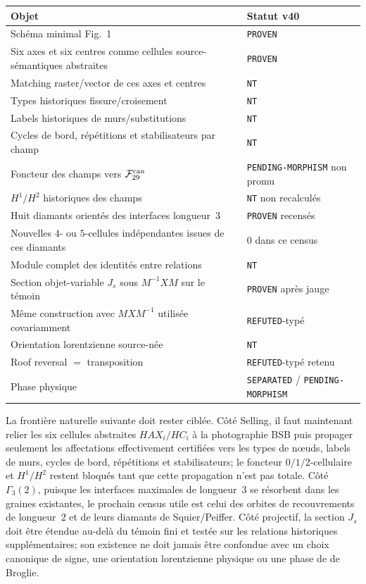 \documentclass[11pt,a4paper]{article}
\newcommand{\certProven}{\texttt{PROVEN}}
\newcommand{\certRefuted}{\texttt{REFUTED}}
\newcommand{\certSeparated}{\texttt{SEPARATED}}
\newcommand{\certPending}{\texttt{PENDING-MORPHISM}}
\newcommand{\certNT}{\texttt{NT}}
\begin{document}
\begin{center}
\begin{tabularx}{\textwidth}{@{}Xl@{}}
\toprule
Objet & Statut v40\\
\midrule
Schéma minimal Fig.~1 & \certProven\\
Six axes et six centres comme cellules source-sémantiques abstraites & \certProven\\
Matching raster/vector de ces axes et centres & \certNT\\
Types historiques fissure/croisement & \certNT\\
Labels historiques de murs/substitutions & \certNT\\
Cycles de bord, répétitions et stabilisateurs par champ & \certNT\\
Foncteur des champs vers $\mathcal F_{29}^{\rm can}$ & \certPending{} non promu\\
$H^1/H^2$ historiques des champs & \certNT{} non recalculés\\
Huit diamants orientés des interfaces longueur~$3$ & \certProven{} recensés\\
Nouvelles $4$- ou $5$-cellules indépendantes issues de ces diamants & $0$ dans ce census\\
Module complet des identités entre relations & \certNT\\
Section objet-variable $J_s$ sous $M^{-1}XM$ sur le témoin & \certProven{} après jauge\\
Même construction avec $MXM^{-1}$ utilisée covariamment & \certRefuted{}-typé\\
Orientation lorentzienne source-née & \certNT\\
Roof reversal $=$ transposition & \certRefuted{}-typé retenu\\
Phase physique & \certSeparated{} / \certPending\\
\bottomrule
\end{tabularx}
\end{center}

La frontière naturelle suivante doit rester ciblée. Côté Selling, il faut maintenant relier les six cellules abstraites $HAX_i/HC_i$ à la photographie BSB puis propager seulement les affectations effectivement certifiées vers les types de nœuds, labels de murs, cycles de bord, répétitions et stabilisateurs; le foncteur $0/1/2$-cellulaire et $H^1/H^2$ restent bloqués tant que cette propagation n'est pas totale. Côté $\Gamma_3(2)$, puisque les interfaces maximales de longueur~$3$ se résorbent dans les graines existantes, le prochain census utile est celui des orbites de recouvrements de longueur~$2$ et de leurs diamants de Squier/Peiffer. Côté projectif, la section $J_s$ doit être étendue au-delà du témoin fini et testée sur les relations historiques supplémentaires; son existence ne doit jamais être confondue avec un choix canonique de signe, une orientation lorentzienne physique ou une phase de de Broglie.
\end{document}
